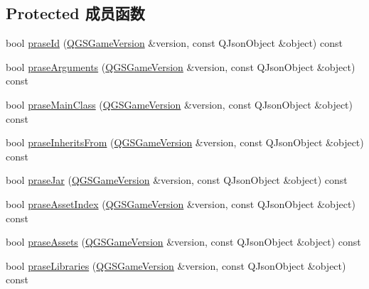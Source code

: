 \subsection*{Protected 成员函数}
\begin{DoxyCompactItemize}
\item 
bool \mbox{\hyperlink{class_q_g_s_general_game_version_prase_strategy_a901298f8b67aece550a312d266383ab6}{prase\+Id}} (\mbox{\hyperlink{class_q_g_s_game_version}{Q\+G\+S\+Game\+Version}} \&version, const Q\+Json\+Object \&object) const
\item 
bool \mbox{\hyperlink{class_q_g_s_general_game_version_prase_strategy_afaba9ca551dbc6b89ef152bdc194d87d}{prase\+Arguments}} (\mbox{\hyperlink{class_q_g_s_game_version}{Q\+G\+S\+Game\+Version}} \&version, const Q\+Json\+Object \&object) const
\item 
bool \mbox{\hyperlink{class_q_g_s_general_game_version_prase_strategy_a24e268c5ba64e22503c7604ef8c6ca31}{prase\+Main\+Class}} (\mbox{\hyperlink{class_q_g_s_game_version}{Q\+G\+S\+Game\+Version}} \&version, const Q\+Json\+Object \&object) const
\item 
bool \mbox{\hyperlink{class_q_g_s_general_game_version_prase_strategy_afa3b0d6144ae31adbd655ed4ecc3edf0}{prase\+Inherits\+From}} (\mbox{\hyperlink{class_q_g_s_game_version}{Q\+G\+S\+Game\+Version}} \&version, const Q\+Json\+Object \&object) const
\item 
bool \mbox{\hyperlink{class_q_g_s_general_game_version_prase_strategy_aafcaa3387165b72061938f8ac3c8faf7}{prase\+Jar}} (\mbox{\hyperlink{class_q_g_s_game_version}{Q\+G\+S\+Game\+Version}} \&version, const Q\+Json\+Object \&object) const
\item 
bool \mbox{\hyperlink{class_q_g_s_general_game_version_prase_strategy_ab2a6105f5d1f4423dfd68e343632c8c3}{prase\+Asset\+Index}} (\mbox{\hyperlink{class_q_g_s_game_version}{Q\+G\+S\+Game\+Version}} \&version, const Q\+Json\+Object \&object) const
\item 
bool \mbox{\hyperlink{class_q_g_s_general_game_version_prase_strategy_a3248b9bc00727b8c44727333cfd32bc2}{prase\+Assets}} (\mbox{\hyperlink{class_q_g_s_game_version}{Q\+G\+S\+Game\+Version}} \&version, const Q\+Json\+Object \&object) const
\item 
bool \mbox{\hyperlink{class_q_g_s_general_game_version_prase_strategy_aa4d349c5c881f4f15272856fee9b1037}{prase\+Libraries}} (\mbox{\hyperlink{class_q_g_s_game_version}{Q\+G\+S\+Game\+Version}} \&version, const Q\+Json\+Object \&object) const
\item 

\end{DoxyCompactItemize}
